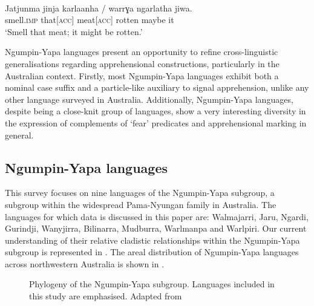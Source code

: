 \documentclass[output=paper,colorlinks,citecolor=brown]{langscibook}
\begin{document}
\ea
{} {\citealt[234]{breen_description_1970}} \\
\gll Jatjunma jinja {karlaanha \textnormal{/}} warrɣa ngarlatha jiwa. \\
smell.\textsc{imp} that[\textsc{acc}] meat[\textsc{acc}] rotten maybe it \\
\glt `Smell that meat; it might be rotten.'
\label{ex:bro13}
\z

 Ngumpin-Yapa languages present an opportunity to refine cross-linguistic generalisations regarding apprehensional constructions, particularly in the Australian context. Firstly, most Ngumpin-Yapa languages exhibit both a nominal case suffix and a particle-like auxiliary to signal apprehension, unlike any other language surveyed in Australia. Additionally, Ngumpin-Yapa languages, despite being a close-knit group of languages, show a very interesting diversity in the expression of complements of `fear' predicates and apprehensional marking in general.

\subsection{Ngumpin-Yapa languages}
\label{subsec:NYlangs}

This survey focuses on nine languages of the Ngumpin-Yapa subgroup, a subgroup within the widespread Pama-Nyungan family in Australia. The languages for which data is discussed in this paper are: Walmajarri, Jaru, Ngardi, Gurindji, Wanyjirra, Bilinarra, Mudburra, Warlmanpa and Warlpiri. Our current understanding of their relative cladistic relationships within the Ngumpin-Yapa subgroup is represented in . The areal distribution of Ngumpin-Yapa languages across northwestern Australia is shown in .


\begin{figure}[p]
\small
{}
    \caption{Phylogeny of the Ngumpin-Yapa subgroup. Languages included in this study are emphasised. Adapted from \citet[791]{mcconvell_loanwords_2009}}
    \label{fig2}
\end{figure}
\end{document}
